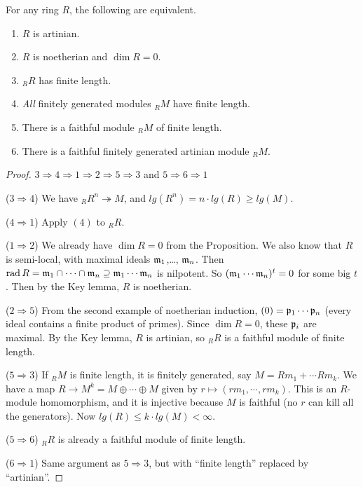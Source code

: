  \begin{theorem}[Akizuki]
   For any ring $R$, the following are equivalent.
   \begin{enumerate}
     \item $R$ is artinian.
     \item $R$ is noetherian and $\dim R=0$.
     \item ${}_R R$ has finite length.
     \item \emph{All} finitely generated modules ${}_R M$ have finite length.
     \item There is a faithful module ${}_R M$ of finite length.
     \item There is a faithful finitely generated artinian module ${}_R M$.
   \end{enumerate}
 \end{theorem}
 \begin{proof}
   $3\Rightarrow 4\Rightarrow 1\Rightarrow 2 \Rightarrow 5 \Rightarrow 3$ and
   $5\Rightarrow 6\Rightarrow 1$

   ($3\Rightarrow 4$) We have ${}_R R^n\twoheadrightarrow M$, and $lg(R^n)=n\cdot lg(R)
   \ge lg(M)$.

   ($4\Rightarrow 1$) Apply $(4)$ to ${}_R R$.

   ($1\Rightarrow 2$) We already have $\dim R=0$ from the Proposition. We also know that
   $R$ is semi-local, with maximal ideals $\mathfrak{m}_1$,\dots, $\mathfrak{m}_n$. Then $\operatorname{rad} R = \mathfrak{m}_1\cap
   \cdots\cap \mathfrak{m}_n\supseteq \mathfrak{m}_1\cdots \mathfrak{m}_n$ is nilpotent. So $(\mathfrak{m}_1\cdots\mathfrak{m}_n)^t=0$ for
   some big $t$. Then by the Key lemma, $R$ is noetherian.

   ($2\Rightarrow 5$) From the second example of noetherian induction, $(0)=\mathfrak{p}_1\cdots
   \mathfrak{p}_n$ (every ideal contains a finite product of primes). Since $\dim R=0$, these
   $\mathfrak{p}_i$ are maximal. By the Key lemma, $R$ is artinian, so ${}_RR$ is a faithful module
   of finite length.

   ($5\Rightarrow 3$) If ${}_R M$ is finite length, it is finitely generated, say $M =
   Rm_1+\cdots Rm_k$. We have a map $R\to M^k=M\oplus \cdots \oplus M$ given by $r\mapsto
   (rm_1,\cdots ,rm_k)$. This is an $R$-module homomorphism, and it is injective because
   $M$ is faithful (no $r$ can kill all the generators). Now $lg(R)\le k\cdot lg(M)<
   \infty$.

   ($5\Rightarrow 6$)  ${}_RR$ is already a faithful module of finite length.

   ($6\Rightarrow 1$) Same argument as $5\Rightarrow 3$, but with ``finite length''
   replaced by ``artinian''.
 \end{proof}
